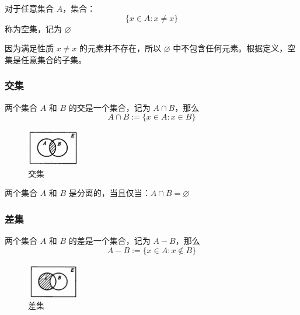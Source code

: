 \begin{definition}[空集 Empty ]
    对于任意集合 $ A $，集合：
    \[
        \{x\in A:x\neq x\} 
    \]
    称为空集，记为 $ \varnothing $
\end{definition}

\begin{note}
因为满足性质 $ x\neq x $ 的元素并不存在，所以 $ \varnothing $ 中不包含任何元素。根据定义，空集是任意集合的子集。
\end{note}
\vspace{1em}

\subsubsection{交集}
\begin{definition}[交集 Intersection]
    两个集合 $ A $ 和 $ B $ 的交是一个集合，记为 $ A\cap  B $，那么
    \[
        A\cap B := \{x\in A : x\in B\} 
    \]
\end{definition}

\begin{figure}[htbp]
    \centering
    \includegraphics[width=0.2\textwidth]{figures/chapter1/chapter1_1} 
    \caption{交集}
    \label{fig:chapter1_1}
\end{figure}
\vspace{1em}

\begin{definition}[分离 Disjoint]
    两个集合 $ A $ 和 $ B $ 是分离的，当且仅当：$ A\cap B = \varnothing $
\end{definition}
\vspace{1em}

\subsubsection{差集}

\begin{definition}[差集 Difference]
    两个集合 $ A $ 和 $ B $ 的差是一个集合，记为 $ A-  B $，那么
    \[
        A-  B := \{x\in A:x\notin B\}
    \]
\end{definition}

\begin{figure}[htbp]
    \centering
    \includegraphics[width=0.2\textwidth]{figures/chapter1/chapter1_2} 
    \caption{差集}
    \label{fig:chapter1_2}
\end{figure}

